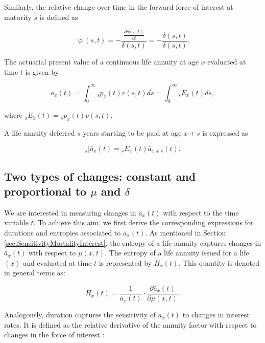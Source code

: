 \documentclass[12pt]{article}
\begin{document}
Similarly, the relative change over time in the forward force of interest at maturity $s$ is defined as 

\begin{equation} \label{eq:phi}
\upvarphi(s,t)=-\frac{\frac{\partial \delta(s,t)}{\partial t}}{\delta(s,t)} = -\frac{\dot{\delta}(s,t)}{\delta(s,t)}.
\end{equation}

The actuarial present value of a continuous life annuity at age $x$ evaluated at time $t$ is given by

\begin{equation}\label{eq:Annuity}
\bar{a}_x(t) = \int_0^\infty {}_sp_x(t) {v}(s,t)ds = \int_0^\infty {}_sE_x(t) ds,
\end{equation}

where ${}_sE_x(t)={}_sp_x(t) {v}(s,t)$. 

A life annuity deferred $s$ years starting to be paid at age $x+s$ is expressed as

\begin{equation}\label{eq:DefAnnuity}
{}_s|\bar{a}_x(t) = {}_sE_x(t) \bar{a}_{x+s}(t).
\end{equation}


\subsection{Two types of changes: constant and proportional to $\mu$ and $\delta$}

We are interested in measuring changes in $\bar{a}_x(t)$ with respect to the time variable $t$. To achieve this aim, we first derive the corresponding expressions for durations and entropies associated to $\bar{a}_x(t)$. As mentioned in Section \ref{sec:SensitivityMortalityInterest}, the entropy of a life annuity captures changes in $\bar{a}_x(t)$ with respect to $\mu(x,t)$. The entropy of a life annuity issued for a life $(x)$ and evaluated at time $t$ is represented by ${H}_{x}(t)$. This quantity is denoted in general terms as:

\begin{equation}\label{eq:EntropyGeneral}
{H}_{x}(t) = \frac{ 1}{\bar{a}_x(t)}\cdot \frac{\partial \bar{a}_x(t) }{\partial \mu(x,t)}.
\end{equation}

Analogously, duration captures the sensitivity of $\bar{a}_x(t)$ to changes in interest rates. It is defined as the relative derivative of the annuity factor with respect to changes in the force of interest \citep{Milevsky2012,Milevsky2012a}:
\end{document}
